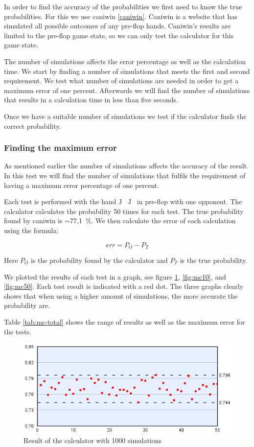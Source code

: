 In order to find the accuracy of the probabilities we first need to know the true probabilities. For this we use caniwin \ref{caniwin}. Caniwin is a website that has simulated all possible outcomes of any pre-flop hands. Caniwin's results are limited to the pre-flop game state, so we can only test the calculator for this game state.

The number of simulations affects the error percentage as well as the calculation time. We start by finding a number of simulations that meets the first and second requirement. We test what number of simulations are needed in order to get a maximum error of one percent. Afterwards we will find the number of simulations that results in a calculation time in less than five seconds.

Once we have a suitable number of simulations we test if the calculator finds the correct probability.

\subsubsection{Finding the maximum error}
\label{sec:mc-test1}
As mentioned earlier the number of simulations affects the accuracy of the result. In this test we will find the number of simulations that fulfils the requirement of having a maximum error percentage of one percent.

Each test is performed with the hand J\clubsuit ~ J\diamondsuit ~ in pre-flop with one opponent. The calculator calculates the probability 50 times for each test. The true probability found by caniwin is $\sim$77,1~\%. 
We then calculate the error of each calculation using the formula:

\[err = P_{O} - P_{T}\]

Here $P_{O}$ is the probability found by the calculator and $P_{T} $ is the true probability. 

We plotted the results of each test in a graph, see figure \ref{fig:mc1}, \ref{fig:mc10}, and \ref{fig:mc50}. 
Each test result is indicated with a red dot. The three graphs clearly shows that when using a higher amount of simulations, the more accurate the probability are.

Table \ref{tab:mc-total} shows the range of results as well as the maximum error for the tests.

\begin{figure}[H]
  \center
    \includegraphics[scale=0.775]{images/MonteCarlo/1k.png}
  \caption{Result of the calculator with 1000 simulations \label{fig:mc1}}
\end{figure}

